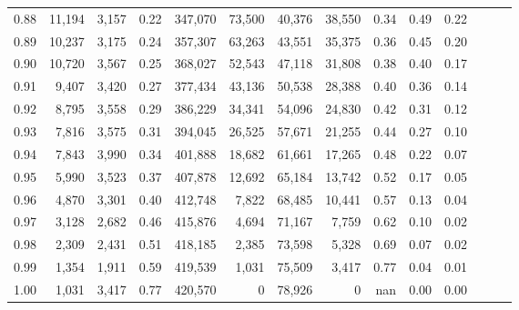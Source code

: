 \begin{tabular}{rrrrrrrrrrrrrr}
0.88 &  11,194 &  3,157 &  0.22 &  347,070 &   73,500 &  40,376 &  38,550 &  0.34 &  0.49 &      0.22 \\
0.89 &  10,237 &  3,175 &  0.24 &  357,307 &   63,263 &  43,551 &  35,375 &  0.36 &  0.45 &      0.20 \\
0.90 &  10,720 &  3,567 &  0.25 &  368,027 &   52,543 &  47,118 &  31,808 &  0.38 &  0.40 &      0.17 \\
0.91 &   9,407 &  3,420 &  0.27 &  377,434 &   43,136 &  50,538 &  28,388 &  0.40 &  0.36 &      0.14 \\
0.92 &   8,795 &  3,558 &  0.29 &  386,229 &   34,341 &  54,096 &  24,830 &  0.42 &  0.31 &      0.12 \\
0.93 &   7,816 &  3,575 &  0.31 &  394,045 &   26,525 &  57,671 &  21,255 &  0.44 &  0.27 &      0.10 \\
0.94 &   7,843 &  3,990 &  0.34 &  401,888 &   18,682 &  61,661 &  17,265 &  0.48 &  0.22 &      0.07 \\
0.95 &   5,990 &  3,523 &  0.37 &  407,878 &   12,692 &  65,184 &  13,742 &  0.52 &  0.17 &      0.05 \\
0.96 &   4,870 &  3,301 &  0.40 &  412,748 &    7,822 &  68,485 &  10,441 &  0.57 &  0.13 &      0.04 \\
0.97 &   3,128 &  2,682 &  0.46 &  415,876 &    4,694 &  71,167 &   7,759 &  0.62 &  0.10 &      0.02 \\
0.98 &   2,309 &  2,431 &  0.51 &  418,185 &    2,385 &  73,598 &   5,328 &  0.69 &  0.07 &      0.02 \\
0.99 &   1,354 &  1,911 &  0.59 &  419,539 &    1,031 &  75,509 &   3,417 &  0.77 &  0.04 &      0.01 \\
1.00 &   1,031 &  3,417 &  0.77 &  420,570 &        0 &  78,926 &       0 &   nan &  0.00 &      0.00 \\
\bottomrule
\end{tabular}
